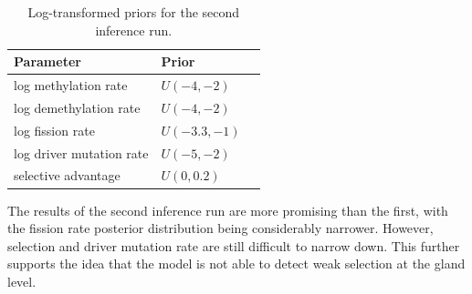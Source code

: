 \begin{table}[ht]
\centering
\begin{tabular}{|l|l|l|}
\hline
Parameter & Prior \\
\hline
log methylation rate & $U(-4, -2)$ \\
log demethylation rate & $U(-4, -2)$\\
log fission rate & $U(-3.3, -1)$\\
log driver mutation rate & $U(-5, -2)$\\
selective advantage & $U(0, 0.2)$\\
\hline
\end{tabular}
\caption{Log-transformed priors for the second inference run.}
\label{tab:inf_ranges_log}
\end{table}

The results of the second inference run are more promising than the first, with
the fission rate posterior distribution being considerably narrower. However,
selection and driver mutation rate are still difficult to narrow down. This
further supports the idea that the model is not able to detect weak selection
at the gland level.

